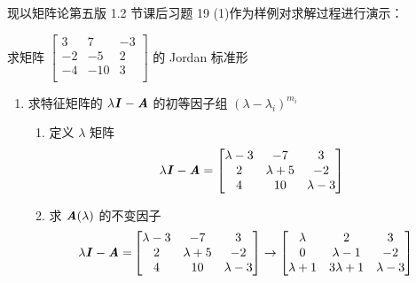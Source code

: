             \par 现以矩阵论第五版 1.2 节课后习题 19 (1)作为样例对求解过程进行演示：
            \\ 
            \begin{problem}
                求矩阵 $\begin{bmatrix}
                    3 & 7 & -3 \\ -2 & -5 & 2 \\ -4 & -10 & 3 \\
                \end{bmatrix}$ 的 Jordan 标准形
            \end{problem}
            \begin{solution}
                \begin{enumerate}
                    \item 求特征矩阵的 $\lambda \textbf{\textit{I}} - \textbf{\textit{A}}$ 的初等因子组 $(\lambda - \lambda_i)^{m_i}$
                        \begin{enumerate}
                            \item 定义 $\lambda$ 矩阵
                                \begin{align*}
                                    \lambda \textbf{\textit{I}} - \textbf{\textit{A}} = \begin{bmatrix}
                                        \lambda - 3 & -7 & 3 \\ 2 & \lambda + 5 & -2 \\ 4 & 10 & \lambda - 3
                                    \end{bmatrix}
                                \end{align*}
                            \item 求 $\textbf{\textit{A}}(\lambda)$ 的不变因子
                            \begin{align*}
                                \lambda \textbf{\textit{I}} - \textbf{\textit{A}} =& \begin{bmatrix}
                                    \lambda - 3 & -7 & 3 \\ 2 & \lambda + 5 & -2 \\ 4 & 10 & \lambda - 3
                                \end{bmatrix} \rightarrow \begin{bmatrix}
                                    \lambda & 2 & 3 \\ 0 & \lambda - 1 & -2 \\ \lambda + 1 & 3\lambda + 1 & \lambda - 3

\end{bmatrix}
\end{align*}
\end{enumerate}
\end{enumerate}
\end{solution}
